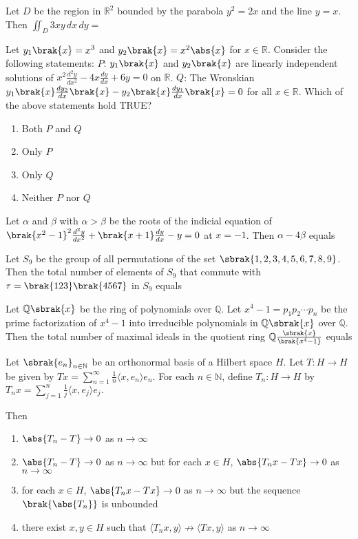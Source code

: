 \item Let $D$ be the region in $\mathbb{R}^2$ bounded by the parabola $y^2 = 2 x$ and the line $y = x$. Then $\iint_D 3 x y \, dx \, dy =$

\item Let $y_1 \brak{x} = x^3$ and $y_2 \brak{x} = x^2 \abs{x}$ for $x \in \mathbb{R}$.
Consider the following statements:
$P$: $y_1 \brak{x}$ and $y_2 \brak{x}$ are linearly independent solutions of $x^2 \frac{d^2 y}{dx^2}  
 - 4 x \frac{dy}{dx} + 6 y = 0$ on $\mathbb{R}$.
$Q$: The Wronskian $y_1 \brak{x} \frac{dy_2}{dx} \brak{x} - y_2 \brak{x} \frac{dy_1}{dx} \brak{x} = 0$ for all $x \in \mathbb{R}$.  
Which of the above statements hold TRUE?

\begin{enumerate}
    \item Both $P$ and $Q$
    \item Only $P$
    \item Only $Q$
    \item Neither $P$ nor $Q$
\end{enumerate}

\item Let $\alpha$ and $\beta$ with $\alpha > \beta$ be the roots of the indicial equation of $\brak{x^2 - 1}^2 \frac{d^2 y}{dx^2} + \brak{x + 1} \frac{dy}{dx} - y = 0$ at $x = -1$. Then $\alpha - 4 \beta$ equals

\item Let $S_9$ be the group of all permutations of the set $\sbrak{1, 2, 3, 4, 5, 6, 7, 8, 9}$. Then the total number of elements of $S_9$ that commute with $\tau = \brak{123} \brak{4567}$ in $S_9$ equals

\item Let $\mathbb{Q} \sbrak{x}$ be the ring of polynomials over $\mathbb{Q}$. Let $x^4 - 1 = p_1 p_2 \cdots p_n$ be the prime factorization of $x^4 - 1$ into irreducible polynomials in $\mathbb{Q} \sbrak{x}$ over $\mathbb{Q}$. Then the total number of maximal ideals in the quotient ring $\mathbb{Q} \frac{\sbrak{x}}{\brak{x^4 - 1}}$ equals

\item Let $\sbrak{e_n}_{n \in \mathbb{N}}$ be an orthonormal basis of a Hilbert space $H$. Let $T: H \to H$ be given by 
$T x = \sum_{n=1}^{\infty} \frac{1}{n} \langle x, e_n \rangle e_n.$
For each $n \in \mathbb{N}$, define $T_n: H \to H$ by 
$T_n x = \sum_{j=1}^{n} \frac{1}{j} \langle x, e_j \rangle e_j.$

Then

\begin{enumerate}
    \item $\abs{T_n - T} \to 0$ as $n \to \infty$
    \item $\abs{T_n - T} \to 0$ as $n \to \infty$ but for each $x \in H$, $\abs{T_n x - T x} \to 0$ as $n \to \infty$
    \item for each $x \in H$, $\abs{T_n x - T x} \to 0$ as $n \to \infty$ but the sequence $\brak{\abs{T_n}}$ is unbounded
    \item there exist $x, y \in H$ such that $\langle T_n x, y \rangle \nrightarrow \langle T x, y \rangle$ as $n \to \infty$
\end{enumerate}


